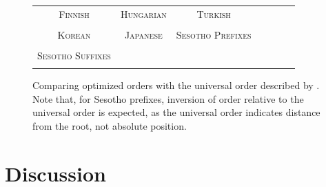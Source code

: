 \documentclass[11pt,letterpaper]{article}
\newcommand{\citep}{\parencite}
\begin{document}
\begin{figure}
\begin{tabular}{ccccccc}
\textsc{Finnish} & \textsc{Hungarian} & \textsc{Turkish} \\
\begin{minipage}{.3\textwidth}
  
    \end{minipage}
    &
    \begin{minipage}{.3\textwidth}
  
    \end{minipage}
        &
    \begin{minipage}{.3\textwidth}
  
    \end{minipage} 
    \\
    \textsc{Korean} & \textsc{Japanese} & \textsc{Sesotho Prefixes} \\
        \begin{minipage}{.3\textwidth}
  
    \end{minipage}
    &
    \begin{minipage}{.3\textwidth}
  
    \end{minipage}
        &
    \begin{minipage}{.3\textwidth}
  
    \end{minipage}
    \\
    \textsc{Sesotho Suffixes} \\
        \begin{minipage}{.3\textwidth}
  
    \end{minipage}
\end{tabular}
    \caption{Comparing optimized orders with the universal order described by \citep{bybee-morphology-1985}.  Note that, for Sesotho prefixes, inversion of order relative to the universal order is expected, as the universal order indicates distance from the root, not absolute position.}
    \label{fig:optimized_and_universal_orders}
\end{figure}


\section{Discussion}
\end{document}
